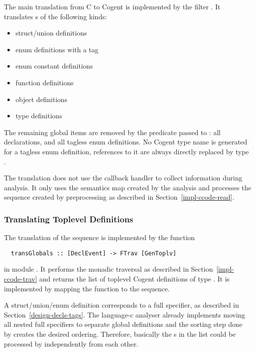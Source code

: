 The main translation from C to Cogent is implemented by the filter . It translates s
of the following kinds:
\begin{itemize}
\item struct/union definitions
\item enum definitions with a tag
\item enum constant definitions
\item function definitions
\item object definitions
\item type definitions
\end{itemize}
The remaining global items are removed by the predicate passed to : all declarations, 
and all tagless enum definitions. No Cogent type name is generated for a tagless enum definition,
references to it are always directly replaced by type .

The translation does not use the callback handler to collect information during analysis. It only uses the semantics map
created by the analysis and processes the  sequence created by preprocessing as described in 
Section~\ref{impl-ccode-read}.

\subsubsection{Translating Toplevel Definitions}

The translation of the  sequence is implemented by the function
\begin{verbatim}
  transGlobals :: [DeclEvent] -> FTrav [GenToplv]
\end{verbatim}
in module .
It performs the monadic traversal as described in Section~\ref{impl-ccode-trav} and returns the list of toplevel
Cogent definitions of type . It is implemented by mapping the function  to the 
 sequence.

A struct/union/enum definition corresponds to a full specifier, as described in Section~\ref{design-decls-tags}.
The language-c analyser already implements moving all nested full specifiers to separate global definitions and the
sorting step done by  creates the desired ordering. Therefore, basically the 
s in the list could be processed by  independently from each other.

